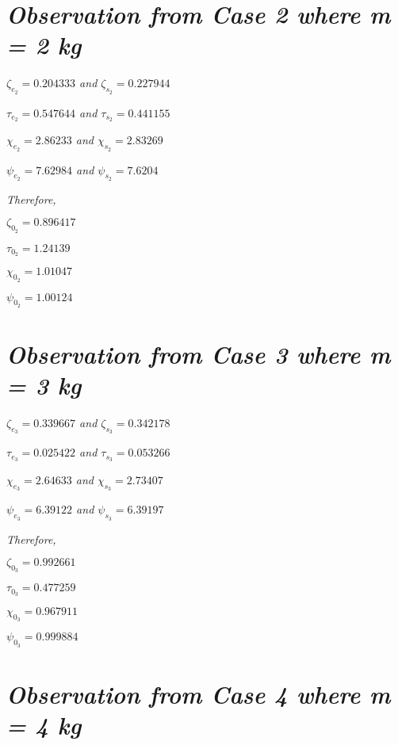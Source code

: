         
        
\section{\textit{Observation from Case 2 where m = 2 kg}}
        
    \textit{$\zeta_{e_2} = 0.204333$ and $\zeta_{s_2} = 0.227944$}
            
    \textit{$\tau_{e_2} = 0.547644$ and $\tau_{s_2} = 0.441155$}
            
    \textit{$\chi_{e_2} = 2.86233$ and $\chi_{s_2} = 2.83269$}
            
    \textit{$\psi_{e_2} = 7.62984$ and $\psi_{s_2} = 7.6204$}
            
    \textit{Therefore,}
            
    $\zeta_{0_2} = 0.896417$
            
    $\tau_{0_2} = 1.24139$
            
    $\chi_{0_2} = 1.01047$
            
    $\psi_{0_2} = 1.00124$    
            
        
        
\section{\textit{Observation from Case 3 where m = 3 kg}}
        
    \textit{$\zeta_{e_3} = 0.339667$ and $\zeta_{s_3} = 0.342178$}
            
    \textit{$\tau_{e_3} = 0.025422$ and $\tau_{s_3} = 0.053266$}
            
    \textit{$\chi_{e_3} = 2.64633$ and $\chi_{s_3} = 2.73407$}
            
    \textit{$\psi_{e_3} = 6.39122$ and $\psi_{s_3} = 6.39197$}
            
    \textit{Therefore,}
            
    $\zeta_{0_3} = 0.992661$
            
    $\tau_{0_3} = 0.477259$
            
    $\chi_{0_3} = 0.967911$
            
    $\psi_{0_3} = 0.999884$    
            
        
        
\section{\textit{Observation from Case 4 where m = 4 kg}}
        
